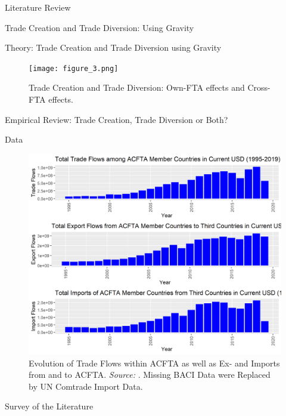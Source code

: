 \begin{section}{Literature Review}
\begin{subsection}{Trade Creation and Trade Diversion: Using Gravity}
\begin{subsubsection}{Theory: Trade Creation and Trade Diversion using Gravity}
\begin{figure}[H]
	\centering
	\texttt{[image: figure\_3.png]}
	\caption{\small{Trade Creation and Trade Diversion: Own-FTA effects and Cross-FTA effects.}}
	\label{fig_3}
\end{figure}

\end{subsubsection}

\begin{subsection}{Empirical Review: Trade Creation, Trade Diversion or Both?}

\begin{subsubsection}{Data}

\begin{figure}[H]
	\centering
	\includegraphics[width=\textwidth]{figure_2.png}
	\caption{\small{Evolution of Trade Flows within ACFTA as well as Ex- and Imports from and to ACFTA. \textit{Source:} \cite{cepii-data_2022}. Missing BACI Data were Replaced by UN Comtrade Import Data.}}
	\label{fig_2}
\end{figure}

\end{subsubsection}

\begin{subsubsection}{Survey of the Literature}


\end{subsubsection}
\end{subsection}
\end{subsection}
\end{section}

